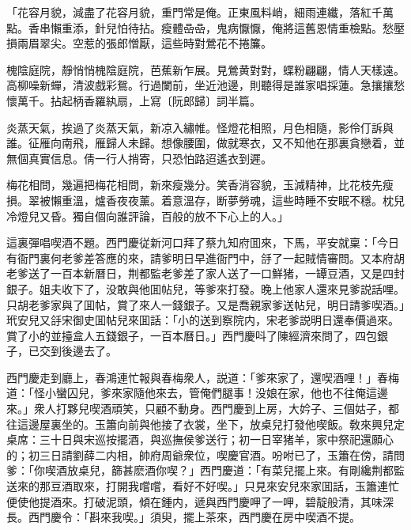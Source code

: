 \begin{myquote}
「花容月貌，減盡了花容月貌，重門常是俺。正東風料峭，細雨連纖，落紅千萬點。香串懶重添，針兒怕待拈。瘦體喦喦，鬼病懨懨，俺將這舊恩情重檢點。愁壓損兩眉翠尖。空惹的張郎憎厭，這些時對鶯花不捲簾。

槐陰庭院，靜悄悄槐陰庭院，芭蕉新乍展。見鶯黄對對，蝶粉翩翩，情人天樣遠。高柳噪新蟬，清波戲彩鴛。行過闌前，坐近池邊，則聽得是誰家唱採蓮。急攘攘愁懷萬千。拈起柄香羅紈扇，上寫〔阮郎歸〕詞半篇。

炎蒸天氣，挨過了炎蒸天氣，新凉入繡帷。怪燈花相照，月色相隨，影伶仃訴與誰。征雁向南飛，雁歸人未歸。想像腰圍，做就寒衣，又不知他在那裏貪戀着，並無個真實信息。倩一行人捎寄，只恐怕路迢遙衣到遲。

梅花相問，幾遍把梅花相問，新來瘦幾分。笑香消容貌，玉減精神，比花枝先瘦損。翠被懶重溫，爐香夜夜薰。着意溫存，断夢勞魂，這些時睡不安眠不穩。枕兒冷燈兒又昏。獨自個向誰評論，百般的放不下心上的人。」
\end{myquote}

這裏彈唱喫酒不題。西門慶従新河口拜了蔡九知府囬來，下馬，平安就稟：「今日有衙門裏何老爹差答應的來，請爹明日早進衙門中，㧱了一起賊情審問。又本府胡老爹送了一百本新曆日，荆都監老爹差了家人送了一口鮮猪，一罈豆酒，又是四封銀子。姐夫收下了，没敢與他囬帖兒，等爹來打發。晚上他家人還來見爹説話哩。只胡老爹家與了囬帖，賞了來人一錢銀子。又是喬親家爹送帖兒，明日請爹喫酒。」玳安兒又㧱宋御史囬帖兒來囬話：「小的送到察院内，宋老爹説明日還奉價過來。賞了小的並擡盒人五錢銀子，一百本曆日。」西門慶呌了陳經濟來問了，四包銀子，已交到後邊去了。

西門慶走到廳上，春鴻連忙報與春梅衆人，説道：「爹來家了，還喫酒哩！」春梅道：「怪小蠻囚兒，爹來家隨他來去，管俺們腿事！没娘在家，他也不往俺這邊來。」衆人打夥兒喫酒頑笑，只顧不動身。西門慶到上房，大妗子、三個姑子，都往這邊屋裏坐的。玉簫向前與他接了衣裳，坐下，放桌兒打發他喫飯。敎來興兒定桌席：三十日與宋巡按擺酒，與巡撫侯爹送行；初一日宰猪羊，家中祭祀還願心的；初三日請劉薛二内相，帥府周爺衆位，喫慶官酒。吩咐已了，玉簫在傍，請問爹：「你喫酒放桌兒，篩甚麽酒你喫？」西門慶道：「有菜兒擺上來。有剛纔荆都監送來的那豆酒取來，打開我嚐嚐，看好不好喫。」只見來安兒來家囬話，玉簫連忙便使他提酒來。打破泥頭，傾在鍾内，遞與西門慶呷了一呷，碧靛般清，其味深長。西門慶令：「斟來我喫。」須臾，擺上茶來，西門慶在房中喫酒不提。

